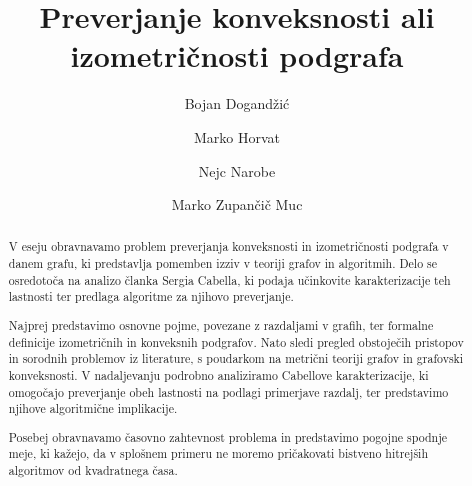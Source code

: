 \documentclass[sigconf
]{acmart}
\theoremstyle{definition}
\begin{document}
\title{Preverjanje konveksnosti ali izometričnosti podgrafa}

\author{Bojan Dogandžić}

\author{Marko Horvat}

\author{Nejc Narobe}

\author{Marko Zupančič Muc}

\renewcommand{\shortauthors}{Dogandžić, et al.}


\begin{abstract}
V eseju obravnavamo problem preverjanja konveksnosti in izometričnosti podgrafa v danem grafu, ki predstavlja pomemben izziv v teoriji grafov in algoritmih. Delo se osredotoča na analizo članka Sergia Cabella, ki podaja učinkovite karakterizacije teh lastnosti ter predlaga algoritme za njihovo preverjanje.

Najprej predstavimo osnovne pojme, povezane z razdaljami v grafih, ter formalne definicije izometričnih in konveksnih podgrafov. Nato sledi pregled obstoječih pristopov in sorodnih problemov iz literature, s poudarkom na metrični teoriji grafov in grafovski konveksnosti. V nadaljevanju podrobno analiziramo Cabellove karakterizacije, ki omogočajo preverjanje obeh lastnosti na podlagi primerjave razdalj, ter predstavimo njihove algoritmične implikacije.

Posebej obravnavamo časovno zahtevnost problema in predstavimo pogojne spodnje meje, ki kažejo, da v splošnem primeru ne moremo pričakovati bistveno hitrejših algoritmov od kvadratnega časa.

\end{abstract}
\end{document}
